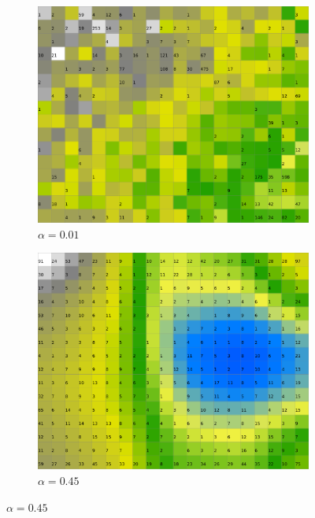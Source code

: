 \documentclass{acm_proc_article-sp}
\begin{document}
\begin{figure}
\centering
    \centering
    \begin{subfigure}[b]{0.24\linewidth}
        \includegraphics[width=\linewidth]{img/wine-20x16-activity-histogram-alpha-0,01}
        \caption{$\alpha=0.01$}
        \label{fig:wine-20x16-activity-histogram-alpha-0,01}
    \end{subfigure}
    \begin{subfigure}[b]{0.24\linewidth}
        \includegraphics[width=\linewidth]{img/wine-20x16-activity-histogram-alpha-0,45}
        \caption{$\alpha=0.45$}
        \label{fig:wine-20x16-activity-histogram-alpha-0,45}

\end{subfigure}
\end{figure}
\end{document}
